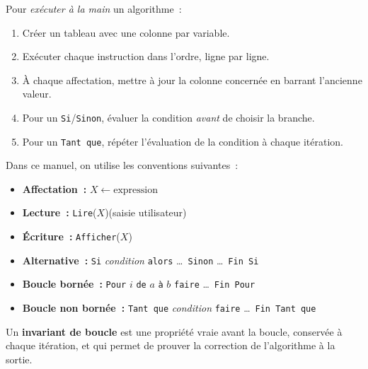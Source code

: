 \begin{methode}
Pour \emph{ex\'ecuter \`a la main} un algorithme~:
\begin{enumerate}
  \item Cr\'eer un tableau avec une colonne par variable.
  \item Ex\'ecuter chaque instruction dans l'ordre, ligne par ligne.
  \item \`A chaque affectation, mettre \`a jour la colonne concern\'ee
        en barrant l'ancienne valeur.
  \item Pour un \texttt{Si}/\texttt{Sinon}, \'evaluer la condition
        \emph{avant} de choisir la branche.
  \item Pour un \texttt{Tant que}, r\'ep\'eter l'\'evaluation de la
        condition \`a chaque it\'eration.
\end{enumerate}
\end{methode}

\begin{methode}
Dans ce manuel, on utilise les conventions suivantes~:
\begin{itemize}
  \item \textbf{Affectation~:} $X \leftarrow \text{expression}$
  \item \textbf{Lecture~:} \texttt{Lire}($X$)\quad (saisie utilisateur)
  \item \textbf{\'Ecriture~:} \texttt{Afficher}($X$)
  \item \textbf{Alternative~:}
        \texttt{Si} \emph{condition} \texttt{alors} \ldots\
        \texttt{Sinon} \ldots\ \texttt{Fin Si}
  \item \textbf{Boucle born\'ee~:}
        \texttt{Pour} $i$ \texttt{de} $a$ \texttt{\`a} $b$ \texttt{faire}
        \ldots\ \texttt{Fin Pour}
  \item \textbf{Boucle non born\'ee~:}
        \texttt{Tant que} \emph{condition} \texttt{faire}
        \ldots\ \texttt{Fin Tant que}
\end{itemize}
\end{methode}

\begin{defn}
Un \textbf{invariant de boucle} est une propri\'et\'e vraie avant
la boucle, conserv\'ee \`a chaque it\'eration, et qui permet de
prouver la correction de l'algorithme \`a la sortie.
\end{defn}

